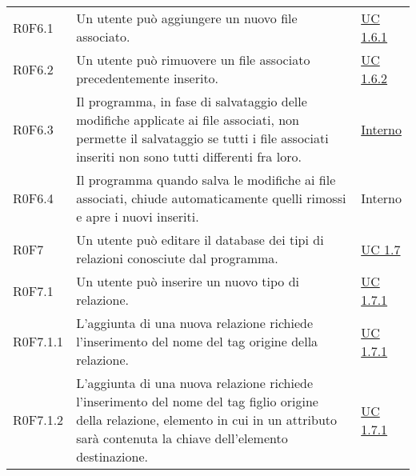 \begin{center}
\begin{longtable}{p{4.2cm}!{\color{white}\vrule width 0.5mm}p{6cm}!{\color{white}\vrule width 0.5mm}p{2.5cm}!{\color{white}\vrule width 0.5mm}}
			\hspace{2mm}\hypertarget{XER0F6.1}{R0F6.1} & Un utente può aggiungere un nuovo file associato. & \hyperref[subsec:XEUC1.6.1]{UC 1.6.1}\\
				
			\hspace{2mm}\hypertarget{XER0F6.2}{R0F6.2} & Un utente può rimuovere un file associato precedentemente inserito. & \hyperref[subsec:XEUC1.6.2]{UC 1.6.2}\\
		
			\hspace{2mm}\hypertarget{XER0F6.3}{R0F6.3} & Il programma, in fase di salvataggio delle modifiche applicate ai file associati, non permette il salvataggio se tutti i file associati inseriti non sono tutti differenti fra loro. & \hyperref[subsec:XEUC1.6]{Interno}\\
			
			\hspace{2mm}\hypertarget{XER0F6.4}{R0F6.4} & Il programma quando salva le modifiche ai file associati, chiude automaticamente quelli rimossi e apre i nuovi inseriti. & Interno\\	
			
		\hspace{0mm}\hypertarget{XER0F7}{R0F7} & Un utente può editare il database dei tipi di relazioni conosciute dal programma. & \hyperref[subsec:XEUC1.7]{UC 1.7}\\
			
			\hspace{2mm}\hypertarget{XER0F7.1}{R0F7.1} & Un utente può inserire un nuovo tipo di relazione. & \hyperref[subsec:XEUC1.7.1]{UC 1.7.1}\\
			
				\hspace{4mm}\hypertarget{XER0F7.1.1}{R0F7.1.1} & L'aggiunta di una nuova relazione richiede l'inserimento del nome del tag origine della relazione. & \hyperref[subsec:XEUC1.7.1]{UC 1.7.1}\\
				
				\hspace{4mm}\hypertarget{XER0F7.1.2}{R0F7.1.2} & L'aggiunta di una nuova relazione richiede l'inserimento del nome del tag figlio origine della relazione, elemento in cui in un attributo sarà contenuta la chiave dell'elemento destinazione. & \hyperref[subsec:XEUC1.7.1]{UC 1.7.1}\\
					

\end{longtable}
\end{center}
